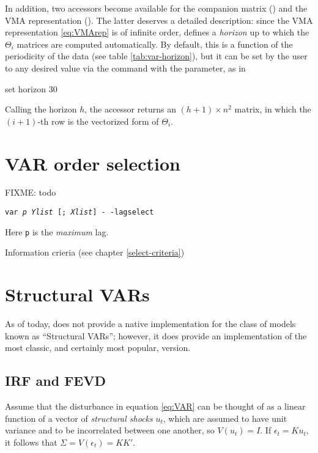 In addition, two accessors become available for the companion matrix
() and the VMA representation (). The
latter deserves a detailed description: since the VMA representation
\eqref{eq:VMArep} is of infinite order,  defines a
\emph{horizon} up to which the $\Theta_i$ matrices are computed
automatically. By default, this is a function of the periodicity of
the data (see table \ref{tab:var-horizon}), but it can be set by the
user to any desired value via the  command with the
 parameter, as in
\begin{code}
set horizon 30
\end{code}
Calling the horizon $h$, the  accessor returns an $(h+1)
\times n^2$ matrix, in which the $(i+1)$-th row is the vectorized form
of $\Theta_i$.

\section{VAR order selection}
\label{sec:lagselect}

\hrulefill FIXME: todo \hrulefill
\begin{flushleft}
    \texttt{var \emph{p} \emph{Ylist} [; \emph{Xlist}] - -lagselect}
\end{flushleft}

Here \texttt{p} is the \emph{maximum} lag.

Information crieria (see chapter \ref{select-criteria})

\hrulefill

\section{Structural VARs}
\label{sec:svar}

As of today,  does not provide a native implementation for
the class of models known as ``Structural VARs''; however, it does
provide an implementation of the most classic, and certainly most
popular, version. 

\subsection{IRF and FEVD}

Assume that the disturbance in equation \eqref{eq:VAR} can be thought
of as a linear function of a vector of \emph{structural shocks} $u_t$,
which are assumed to have unit variance and to be incorrelated between
one another, so $V(u_t) = I$. If $\epsilon_t = K u_t$, it follows that
$\Sigma = V(\epsilon_t) = KK'$.

